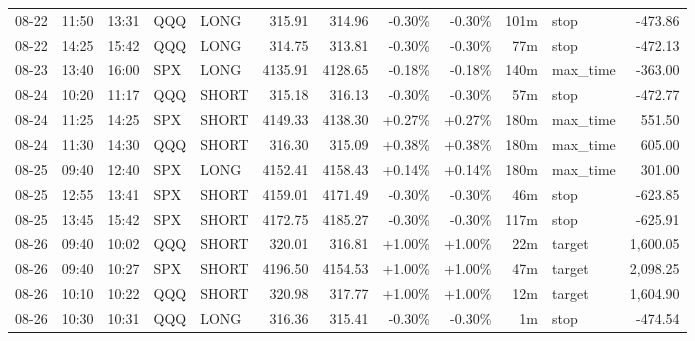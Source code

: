 \documentclass[11pt,a4paper,twoside]{article}
\begin{document}
\begin{center}
\begin{longtable}{>{\color{txtmain}}l l l l l r r r r r >{\color{txtmain}}l r}
08-22 & 11:50 & 13:31 & QQQ & LONG & 315.91 & 314.96 & \textcolor{lossred}{-0.30\%} & \textcolor{lossred}{-0.30\%} & 101m & stop & \textcolor{lossred}{-473.86} \\
08-22 & 14:25 & 15:42 & QQQ & LONG & 314.75 & 313.81 & \textcolor{lossred}{-0.30\%} & \textcolor{lossred}{-0.30\%} & 77m & stop & \textcolor{lossred}{-472.13} \\
08-23 & 13:40 & 16:00 & SPX & LONG & 4135.91 & 4128.65 & \textcolor{lossred}{-0.18\%} & \textcolor{lossred}{-0.18\%} & 140m & max\_time & \textcolor{lossred}{-363.00} \\
08-24 & 10:20 & 11:17 & QQQ & SHORT & 315.18 & 316.13 & \textcolor{lossred}{-0.30\%} & \textcolor{lossred}{-0.30\%} & 57m & stop & \textcolor{lossred}{-472.77} \\
08-24 & 11:25 & 14:25 & SPX & SHORT & 4149.33 & 4138.30 & \textcolor{wingreen}{+0.27\%} & \textcolor{wingreen}{+0.27\%} & 180m & max\_time & \textcolor{wingreen}{551.50} \\
08-24 & 11:30 & 14:30 & QQQ & SHORT & 316.30 & 315.09 & \textcolor{wingreen}{+0.38\%} & \textcolor{wingreen}{+0.38\%} & 180m & max\_time & \textcolor{wingreen}{605.00} \\
08-25 & 09:40 & 12:40 & SPX & LONG & 4152.41 & 4158.43 & \textcolor{wingreen}{+0.14\%} & \textcolor{wingreen}{+0.14\%} & 180m & max\_time & \textcolor{wingreen}{301.00} \\
08-25 & 12:55 & 13:41 & SPX & SHORT & 4159.01 & 4171.49 & \textcolor{lossred}{-0.30\%} & \textcolor{lossred}{-0.30\%} & 46m & stop & \textcolor{lossred}{-623.85} \\
08-25 & 13:45 & 15:42 & SPX & SHORT & 4172.75 & 4185.27 & \textcolor{lossred}{-0.30\%} & \textcolor{lossred}{-0.30\%} & 117m & stop & \textcolor{lossred}{-625.91} \\
08-26 & 09:40 & 10:02 & QQQ & SHORT & 320.01 & 316.81 & \textcolor{wingreen}{+1.00\%} & \textcolor{wingreen}{+1.00\%} & 22m & target & \textcolor{wingreen}{1,600.05} \\
08-26 & 09:40 & 10:27 & SPX & SHORT & 4196.50 & 4154.53 & \textcolor{wingreen}{+1.00\%} & \textcolor{wingreen}{+1.00\%} & 47m & target & \textcolor{wingreen}{2,098.25} \\
08-26 & 10:10 & 10:22 & QQQ & SHORT & 320.98 & 317.77 & \textcolor{wingreen}{+1.00\%} & \textcolor{wingreen}{+1.00\%} & 12m & target & \textcolor{wingreen}{1,604.90} \\
08-26 & 10:30 & 10:31 & QQQ & LONG & 316.36 & 315.41 & \textcolor{lossred}{-0.30\%} & \textcolor{lossred}{-0.30\%} & 1m & stop & \textcolor{lossred}{-474.54} \\

\end{longtable}
\end{center}
\end{document}
